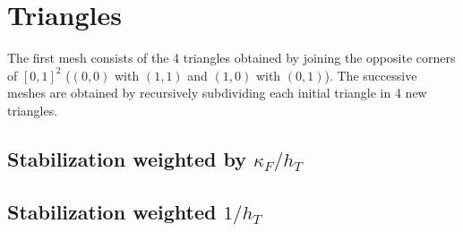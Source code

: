 \documentclass[10pt]{article}
\begin{document}
\section{Triangles}
The first mesh consists of the 4 triangles obtained by joining the opposite corners of $[0,1]^2$ ($(0,0)$ with $(1,1)$ and $(1,0)$ with $(0,1)$). The successive meshes are obtained by recursively subdividing each initial triangle in 4 new triangles.
\subsection{Stabilization weighted by $\kappa_F/h_T$}
  \begin{figure}[ht]
    \centering
      \scalebox{0.7}{}%
      \scalebox{0.7}{}
      \scalebox{0.7}{}%
      \scalebox{0.7}{}
  \end{figure}

  \begin{figure}[ht]
    \centering
      \scalebox{0.7}{}%
      \scalebox{0.7}{}
      \scalebox{0.7}{}%
      \scalebox{0.7}{}
      \scalebox{0.7}{}%
      \scalebox{0.7}{}
  \end{figure}

  \begin{figure}[ht]
    \centering
      \scalebox{0.7}{}%
      \scalebox{0.7}{}
      \scalebox{0.7}{}%
      \scalebox{0.7}{}
      \scalebox{0.7}{}%
      \scalebox{0.7}{}
  \end{figure}

\FloatBarrier
\subsection{Stabilization weighted $1/h_T$}
  \begin{figure}[ht]
    \centering
      \scalebox{0.7}{}%
      \scalebox{0.7}{}
      \scalebox{0.7}{}%
      \scalebox{0.7}{}
  \end{figure}
\end{document}
